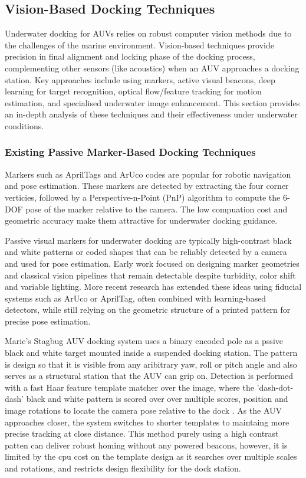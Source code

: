 \subsection{Vision-Based Docking Techniques}

Underwater docking for AUVs relies on robust computer vision methods due to the challenges of the marine environment. Vision-based techniques provide precision in final alignment and locking phase of the docking process, complementing other sensors (like acoustics) when an AUV approaches a docking station. Key approaches include using markers, active visual beacons, deep learning for target recognition, optical flow/feature tracking for motion estimation, and specialised underwater image enhancement. This section provides an in-depth analysis of these techniques and their effectiveness under underwater conditions.

\subsubsection{Existing Passive Marker-Based Docking Techniques}
\label{sec:passive-marker-docking}
Markers such as AprilTags and ArUco codes are popular for robotic navigation and pose estimation. These markers are detected by extracting the four corner verticies, followed by a Perspective-n-Point (PnP) algorithm to compute the 6-DOF pose of the marker relative to the camera. The low compuation cost and geometric accuracy make them attractive for underwater docking guidance.

Passive visual markers for underwater docking are typically high-contrast black and white patterns or coded shapes that can be reliably detected by a camera and used for pose estimation. Early work focused on designing marker geometries and classical vision pipelines that remain detectable despite turbidity, color shift and variable lighting. More recent research has extended these ideas using fiducial systems such as ArUco or AprilTag, often combined with learning-based detectors, while still relying on the geometric structure of a printed pattern for precise pose estimation.

Marie's Stagbug AUV docking system uses a binary encoded pole as a pssive black and white target mounted inside a suspended docking station. The pattern is design so that it is visible from any aribitrary yaw, roll or pitch angle and also serves as a structural station that the AUV can grip on. Detection is performed with a fast Haar feature template matcher over the image, where the 'dash-dot-dash' black and white pattern is scored over over multiple scores, position and image rotations to locate the camera pose relative to the dock \cite{maire2009vision}. As the AUV approaches closer, the system switches to shorter templates to maintaing more precise tracking at close distance. This method purely using a high contrast patten can deliver robust homing without any powered beacons, however, it is limited by the cpu cost on the template design as it searches over multiple scales and rotations, and restricts design flexibility for the dock station.

